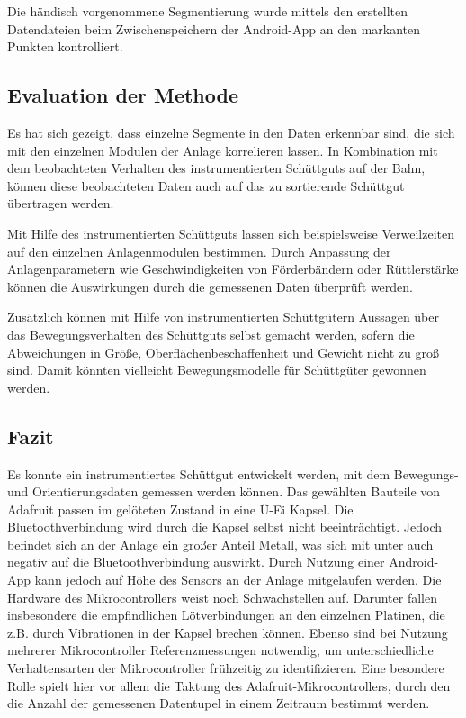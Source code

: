 Die händisch vorgenommene Segmentierung wurde mittels den erstellten Datendateien beim Zwischenspeichern der Android-App an den markanten Punkten kontrolliert.

\subsection{Evaluation der Methode}

Es hat sich gezeigt, dass einzelne Segmente in den Daten erkennbar sind, die sich mit den einzelnen Modulen der Anlage korrelieren lassen. In Kombination mit dem beobachteten Verhalten des instrumentierten Schüttguts auf der Bahn, können diese beobachteten Daten auch auf das zu sortierende Schüttgut übertragen werden. 

Mit Hilfe des instrumentierten Schüttguts lassen sich beispielsweise Verweilzeiten auf den einzelnen Anlagenmodulen bestimmen. Durch Anpassung der Anlagenparametern wie Geschwindigkeiten von Förderbändern oder Rüttlerstärke können die Auswirkungen durch die gemessenen Daten überprüft werden.

Zusätzlich können mit Hilfe von instrumentierten Schüttgütern Aussagen über das Bewegungsverhalten des Schüttguts selbst gemacht werden, sofern die Abweichungen in Größe, Oberflächenbeschaffenheit und Gewicht nicht zu groß sind. Damit könnten vielleicht Bewegungsmodelle für Schüttgüter gewonnen werden.

\subsection{Fazit}

Es konnte ein instrumentiertes Schüttgut entwickelt werden, mit dem Bewegungs- und Orientierungsdaten gemessen werden können. Das gewählten Bauteile von Adafruit passen im gelöteten Zustand in eine Ü-Ei Kapsel. Die Bluetoothverbindung wird durch die Kapsel selbst nicht beeinträchtigt. Jedoch befindet sich an der Anlage ein großer Anteil Metall, was sich mit unter auch negativ auf die Bluetoothverbindung auswirkt. Durch Nutzung einer Android-App kann jedoch auf Höhe des Sensors an der Anlage mitgelaufen werden. Die Hardware des Mikrocontrollers weist noch Schwachstellen auf. Darunter fallen insbesondere die empfindlichen Lötverbindungen an den einzelnen Platinen, die z.B. durch Vibrationen in der Kapsel brechen können. Ebenso sind bei Nutzung mehrerer Mikrocontroller Referenzmessungen notwendig, um unterschiedliche Verhaltensarten der Mikrocontroller frühzeitig zu identifizieren. Eine besondere Rolle spielt hier vor allem die Taktung des Adafruit-Mikrocontrollers, durch den die Anzahl der gemessenen Datentupel in einem Zeitraum bestimmt werden.

